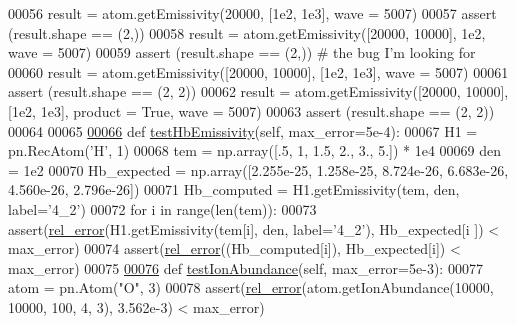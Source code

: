 \begin{DoxyCode}
00056                 result = atom.getEmissivity(20000, [1e2, 1e3], wave = 5007)
00057                 \textcolor{keyword}{assert} (result.shape == (2,))
00058                 result = atom.getEmissivity([20000, 10000], 1e2, wave = 5007)
00059                 \textcolor{keyword}{assert} (result.shape == (2,)) \textcolor{comment}{# the bug I'm looking for}
00060                 result = atom.getEmissivity([20000, 10000], [1e2, 1e3], wave = 5007)            
00061                 \textcolor{keyword}{assert} (result.shape == (2, 2))
00062                 result = atom.getEmissivity([20000, 10000], [1e2, 1e3], product = \textcolor{keyword}{True}, wave = 5007)            
00063                 \textcolor{keyword}{assert} (result.shape == (2, 2))
00064                 
00065 
\hypertarget{unit_test_8py_source_l00066}{}\hyperlink{classpyneb_1_1test_1_1unit_test_1_1_unit_test_a2f991eb62fa070893eacc36ce1879004}{00066}         \textcolor{keyword}{def }\hyperlink{classpyneb_1_1test_1_1unit_test_1_1_unit_test_a2f991eb62fa070893eacc36ce1879004}{testHbEmissivity}(self, max\_error=5e-4):
00067                 H1 = pn.RecAtom(\textcolor{stringliteral}{'H'}, 1)
00068                 tem = np.array([.5, 1, 1.5, 2., 3., 5.]) * 1e4
00069                 den = 1e2
00070                 Hb\_expected = np.array([2.255e-25, 1.258e-25, 8.724e-26, 6.683e-26, 4.560e-26, 2.796e-26])
00071                 Hb\_computed = H1.getEmissivity(tem, den, label=\textcolor{stringliteral}{'4\_2'})
00072                 \textcolor{keywordflow}{for} i \textcolor{keywordflow}{in} range(len(tem)):
00073                         assert(\hyperlink{namespacepyneb_1_1test_1_1unit_test_aff3b7f847905c444d8b10727f10de236}{rel\_error}(H1.getEmissivity(tem[i], den, label=\textcolor{stringliteral}{'4\_2'}), Hb\_expected[i
      ]) < max\_error)
00074                         assert(\hyperlink{namespacepyneb_1_1test_1_1unit_test_aff3b7f847905c444d8b10727f10de236}{rel\_error}((Hb\_computed[i]), Hb\_expected[i]) < max\_error)
00075                 
\hypertarget{unit_test_8py_source_l00076}{}\hyperlink{classpyneb_1_1test_1_1unit_test_1_1_unit_test_a7a316a645d962527433b1e5b4de4f5ce}{00076}         \textcolor{keyword}{def }\hyperlink{classpyneb_1_1test_1_1unit_test_1_1_unit_test_a7a316a645d962527433b1e5b4de4f5ce}{testIonAbundance}(self, max\_error=5e-3):
00077                 atom = pn.Atom(\textcolor{stringliteral}{"O"}, 3)
00078                 assert(\hyperlink{namespacepyneb_1_1test_1_1unit_test_aff3b7f847905c444d8b10727f10de236}{rel\_error}(atom.getIonAbundance(10000, 10000, 100, 4, 3), 3.562e-3) < 
      max\_error)

\end{DoxyCode}
